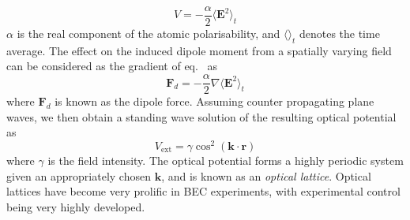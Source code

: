 \begin{equation}\label{eqn:acshift}
V = -\frac{\alpha}{2}\langle \mathbf{E}^2\rangle_t
\end{equation}
$\alpha$ is the real component of the atomic polarisability, and $\langle \rangle_t$ denotes the time average. The effect on the induced dipole moment from a spatially varying field can be considered as the gradient of eq.~\label{eqn:acshift} as
\begin{equation}
\mathbf{F}_d = -\frac{\alpha}{2}\nabla\langle \mathbf{E}^2 \rangle_t
\end{equation}
where $\mathbf{F}_d$ is known as the dipole force. Assuming counter propagating plane waves, we then obtain a standing wave solution of the resulting optical potential as
\begin{equation}
    V_{\textrm{ext}} = \gamma \cos^2 (\mathbf{k} \cdot \mathbf{r})
\end{equation}
where $\gamma$ is the field intensity. The optical potential forms a highly periodic system given an appropriately chosen $\mathbf{k}$, and is known as an \textit{optical lattice}. Optical lattices have become very prolific in BEC experiments, with experimental control being very highly developed.

